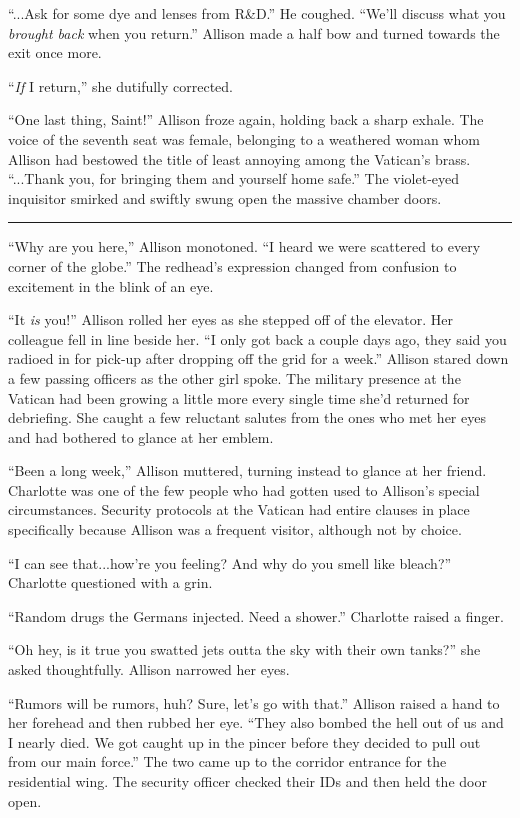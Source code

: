 \begin{Standard}
``...Ask for some dye and lenses from R\&D.'' He coughed. ``We'll discuss what you
\emph{brought back} when you return.'' Allison made a half bow and turned towards the
exit once more.

``\emph{If} I return,'' she dutifully corrected.

``One last thing, Saint!'' Allison froze again, holding back a sharp exhale.
The voice of the seventh seat was female, belonging to a weathered woman whom
Allison had bestowed the title of least annoying among the Vatican's brass.
``...Thank you, for bringing them and yourself home safe.'' The violet-eyed
inquisitor smirked and swiftly swung open the massive chamber doors.

\fancybreak{* * *}

``Why are you here,'' Allison monotoned. ``I heard we were scattered to every corner
of the globe.'' The redhead's expression changed from confusion to excitement in the
blink of an eye.

``It \emph{is} you!'' Allison rolled her eyes as she stepped off of the elevator.
Her colleague fell in line beside her. ``I only got back a couple days ago,
they said you radioed in for pick-up after dropping off the grid for a week.''
Allison stared down a few passing officers as the other girl spoke. The military
presence at the Vatican had been growing a little more every single time she'd returned
for debriefing. She caught a few reluctant salutes from the ones who met her eyes
and had bothered to glance at her emblem.

``Been a long week,'' Allison muttered, turning instead to glance at her friend.
Charlotte was one of the few people who had gotten used to Allison's
special circumstances. Security protocols at the Vatican had entire clauses
in place specifically because Allison was a frequent visitor, although not by choice.

``I can see that...how're you feeling? And why do you smell like bleach?'' Charlotte
questioned with a grin.

``Random drugs the Germans injected. Need a shower.'' Charlotte raised a finger.

``Oh hey, is it true you swatted jets outta the sky with their own tanks?'' she
asked thoughtfully. Allison narrowed her eyes.

``Rumors will be rumors, huh? Sure, let's go with that.'' Allison raised a hand
to her forehead and then rubbed her eye. ``They also bombed the hell out of us
and I nearly died. We got caught up in the pincer before they decided to pull
out from our main force.'' The two came up to the corridor entrance for the
residential wing. The security officer checked their IDs and then held the door
open.


\end{Standard}
